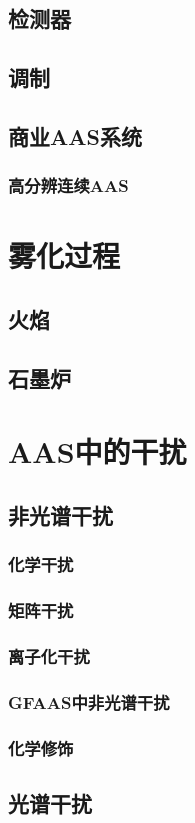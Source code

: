 \subsection{检测器}
\subsection{调制}
\subsection{商业AAS系统}
\subsubsection{高分辨连续AAS}
\section{雾化过程}
\subsection{火焰}
\subsection{石墨炉}
\section{AAS中的干扰}
\subsection{非光谱干扰}
\subsubsection{化学干扰}
\subsubsection{矩阵干扰}
\subsubsection{离子化干扰}
\subsubsection{GFAAS中非光谱干扰}
\subsubsection{化学修饰}
\subsection{光谱干扰}
